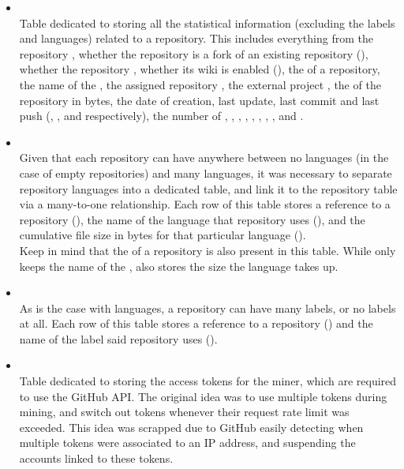 \begin{itemize}
    \item {}
    \\Table dedicated to storing all the statistical information (excluding the labels and languages) related to a repository. This includes everything from the repository , whether the repository is a fork of an existing repository (), whether the repository , whether its wiki is enabled (), the  of a repository, the name of the , the assigned repository , the external project , the  of the repository in bytes, the date of creation, last update, last commit and last push (, ,  and  respectively), the number of , , , , , , , ,  and .
    \item {}
    \\Given that each repository can have anywhere between no languages (in the case of empty repositories) and many languages, it was necessary to separate repository languages into a dedicated table, and link it to the repository table via a many-to-one relationship. Each row of this table stores a reference to a repository (), the name of the language that repository uses (), and the cumulative file size in bytes for that particular language ().
    \\Keep in mind that the  of a repository is also present in this table. While  only keeps the name of the ,  also stores the size the language takes up.
    \item {}
    \\As is the case with languages, a repository can have many labels, or no labels at all. Each row of this table stores a reference to a repository () and the name of the label said repository uses ().
    \item {}
    \\Table dedicated to storing the access tokens for the miner, which are required to use the GitHub API\@. The original idea was to use multiple tokens during mining, and switch out tokens whenever their request rate limit was exceeded. This idea was scrapped due to GitHub easily detecting when multiple tokens were associated to an IP address, and suspending the accounts linked to these tokens.

\end{itemize}
